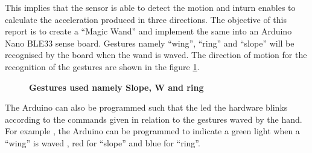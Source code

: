 This implies that the sensor is able to detect the motion and inturn enables to calculate the acceleration produced in three directions. 
The objective of this report is to create a ``Magic Wand'' and implement the same into an Arduino Nano BLE33 sense  board. Gestures namely ``wing'', ``ring'' and ``slope'' will be recognised by the board when the wand is waved. The direction of motion for the recognition of the gestures are shown in the figure \ref{gestures}.

\begin{figure}
    
    \begin{center} 
        \caption{\textbf{Gestures used namely Slope, W and ring}} \label{gestures} 
    \end{center} 
\end{figure} 
The Arduino can also be programmed such that the \ac{led}  the hardware blinks according to the commands given in relation to the gestures waved by the hand. For example , the Arduino can be programmed to indicate a green light when a ``wing'' is waved , red for ``slope'' and  blue for ``ring''.

